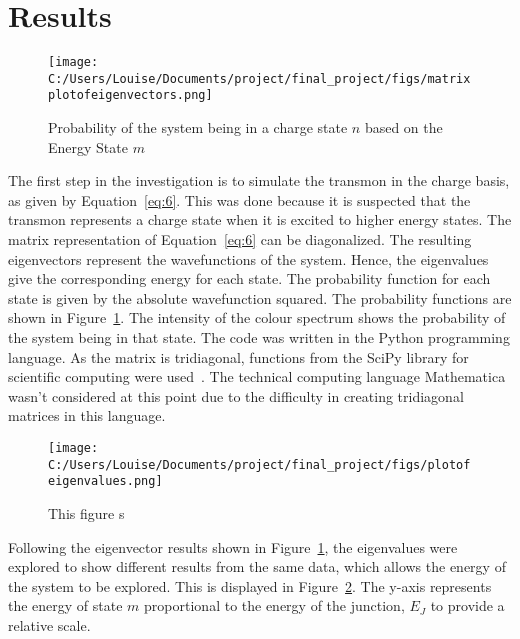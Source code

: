 \documentclass[11pt]{article}
\begin{document}
\section{Results}

\begin{figure}[ht]
\centering
\texttt{[image: C:/Users/Louise/Documents/project/final\_project/figs/matrixplotofeigenvectors.png]}
\caption{Probability of the system being in a charge state $n$ based on the Energy State $m$ }
\label{fig:graph1}
\end{figure}
The first step in the investigation is to simulate the transmon in the charge basis, as given by Equation~\ref{eq:6}. This was done because it is suspected that the transmon represents a charge state when it is excited to higher energy states. The matrix representation of Equation~\ref{eq:6} can be diagonalized. The resulting eigenvectors represent the wavefunctions of the system. Hence, the eigenvalues give the corresponding energy for each state. The probability function for each state is given by the absolute wavefunction squared. The probability functions are shown in Figure~\ref{fig:graph1}. The intensity of the colour spectrum shows the probability of the system being in that state. The code was written in the Python programming language. As the matrix is tridiagonal, functions from the SciPy library for scientific computing were used~\cite{jonesSciPyOpenSource2001}. The technical computing language Mathematica wasn't considered at this point due to the difficulty in creating tridiagonal matrices in this language.
\begin{figure}[ht]
\centering
\texttt{[image: C:/Users/Louise/Documents/project/final\_project/figs/plotofeigenvalues.png]}
\caption{This figure s}
\label{fig:graph2}
\end{figure}
Following the eigenvector results shown in Figure~\ref{fig:graph1}, the eigenvalues were explored to show different results from the same data, which allows the energy of the system to be explored. This is displayed in Figure~\ref{fig:graph2}. The y-axis represents the energy of state $m$ proportional to the energy of the junction, $E_J$ to provide a relative scale.
\end{document}
